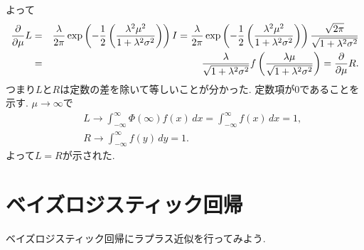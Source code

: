 よって
\begin{eqnarray*}
\frac{\partial}{\partial \mu}L
 &=& \frac{\lambda}{2\pi} \exp\left(-\frac{1}{2}\left(\frac{\lambda^2\mu^2}{1+\lambda^2 \sigma^2}\right)\right) I
 = \frac{\lambda}{2\pi} \exp\left(-\frac{1}{2}\left(\frac{\lambda^2\mu^2}{1+\lambda^2 \sigma^2}\right)\right) \frac{\sqrt{2\pi}}{\sqrt{1+\lambda^2\sigma^2}}\\
 &=& \frac{\lambda}{\sqrt{1+\lambda^2\sigma^2}}f\left(\frac{\lambda\mu}{\sqrt{1+\lambda^2\sigma^2}}\right)
 = \frac{\partial}{\partial \mu}R.
\end{eqnarray*}
つまり$L$と$R$は定数の差を除いて等しいことが分かった. 定数項が$0$であることを示す. $\mu \rightarrow \infty$で
\begin{eqnarray*}
&& L \rightarrow \int_{-\infty}^\infty \Phi(\infty)f(x)\,dx=\int_{-\infty}^\infty f(x)\,dx=1,
\\
&& R \rightarrow \int_{-\infty}^\infty f(y)\,dy=1.
\end{eqnarray*}
よって$L=R$が示された.

\section{ベイズロジスティック回帰}\label{ch4_bayes}
ベイズロジスティック回帰にラプラス近似を行ってみよう.

